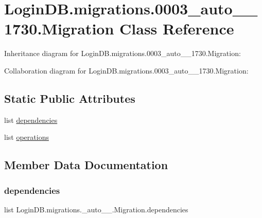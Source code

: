 \hypertarget{class_login_d_b_1_1migrations_1_10003__auto__20201206__1730_1_1_migration}{}\section{Login\+D\+B.\+migrations.0003\+\_\+auto\+\_\+\_\+1730.Migration Class Reference}
\label{class_login_d_b_1_1migrations_1_10003__auto__20201206__1730_1_1_migration}


Inheritance diagram for Login\+D\+B.\+migrations.0003\+\_\+auto\+\_\+\_\+1730.Migration\+:


Collaboration diagram for Login\+D\+B.\+migrations.0003\+\_\+auto\+\_\+\_\+1730.Migration\+:
\subsection*{Static Public Attributes}
\begin{DoxyCompactItemize}
\item 
list \hyperlink{class_login_d_b_1_1migrations_1_10003__auto__20201206__1730_1_1_migration_a07841fdb53de62de2ddc5dbe64c372ba}{dependencies}
\item 
list \hyperlink{class_login_d_b_1_1migrations_1_10003__auto__20201206__1730_1_1_migration_a1b76c1a482a06f294d6e9568b027dcc5}{operations}
\end{DoxyCompactItemize}


\subsection{Member Data Documentation}
\mbox{\label{class_login_d_b_1_1migrations_1_10003__auto__20201206__1730_1_1_migration_a07841fdb53de62de2ddc5dbe64c372ba}} 
\subsubsection{\texorpdfstring{dependencies}{dependencies}}
{\footnotesize\ttfamily list Login\+D\+B.\+migrations.\+\_\+auto\+\_\+\_.\+Migration.\+dependencies\hspace{0.3cm}{\ttfamily [static]}}


